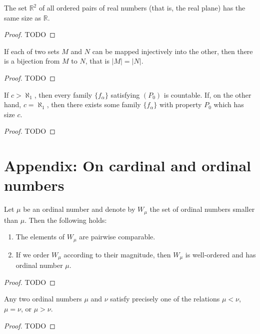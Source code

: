 \begin{theorem}
  \label{ch19theorem3}
  The set  \(\mathbb{R}^2\) of all ordered pairs of real numbers (that is, the
  real plane) has the same size as \(\mathbb{R}\).
\end{theorem}
\begin{proof}
  TODO
\end{proof}

\begin{theorem}
  \label{ch19theorem4}
  If each of two sets \(M\) and \(N\) can be mapped injectively into
  the other, then there is a bijection from \(M\) to \(N\), that is \(|M| = |N|\).
\end{theorem}
\begin{proof}
  TODO
\end{proof}

\begin{theorem}
  \label{ch19theorem5}
  If \(c > \aleph_1\), then every family \(\{f_\alpha\}\) satisfying \((P_0)\) is countable.
  If, on the other hand, \(c = \aleph_1\), then there exists some family \(\{f_\alpha\}\) with
  property \(P_0\) which has size \(c\).
\end{theorem}
\begin{proof}
  TODO
\end{proof}

\section*{Appendix: On cardinal and ordinal numbers}

\begin{proposition}
  \label{ch19proposition1}
  Let \(\mu\) be an ordinal number and denote by \(W_\mu\) the set of
  ordinal numbers smaller than \(\mu\). Then the following holds:
  \begin{enumerate}
    \item The elements of \(W_\mu\) are pairwise comparable.
    \item If we order \(W_\mu\) according to their magnitude, then \(W_\mu\) is well-ordered and
    has ordinal number \(\mu\).
  \end{enumerate}
\end{proposition}
\begin{proof}
  TODO
\end{proof}

\begin{proposition}
  \label{ch19proposition2}
  Any two ordinal numbers \(\mu\) and \(\nu\) satisfy precisely one of
  the relations \(\mu < \nu\), \(\mu = \nu\), or \(\mu > \nu\).
\end{proposition}
\begin{proof}
  TODO
\end{proof}


